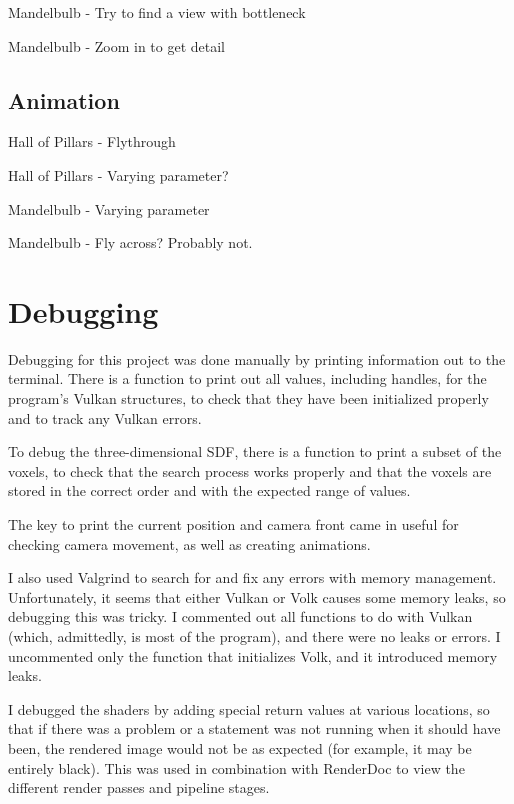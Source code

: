 Mandelbulb - Try to find a view with bottleneck

Mandelbulb - Zoom in to get detail

\subsection{Animation}

Hall of Pillars - Flythrough

Hall of Pillars - Varying parameter?

Mandelbulb - Varying parameter

Mandelbulb - Fly across? Probably not.

\section{Debugging}

Debugging for this project was done manually by printing information out to the terminal. There is a function to print out all values, including handles, for the program's Vulkan structures, to check that they have been initialized properly and to track any Vulkan errors.\newline

To debug the three-dimensional SDF, there is a function to print a subset of the voxels, to check that the search process works properly and that the voxels are stored in the correct order and with the expected range of values.\newline

The key to print the current position and camera front came in useful for checking camera movement, as well as creating animations.\newline

I also used Valgrind to search for and fix any errors with memory management. Unfortunately, it seems that either Vulkan or Volk causes some memory leaks, so debugging this was tricky. I commented out all functions to do with Vulkan (which, admittedly, is most of the program), and there were no leaks or errors. I uncommented only the function that initializes Volk, and it introduced memory leaks.\newline

I debugged the shaders by adding special return values at various locations, so that if there was a problem or a statement was not running when it should have been, the rendered image would not be as expected (for example, it may be entirely black). This was used in combination with RenderDoc to view the different render passes and pipeline stages.